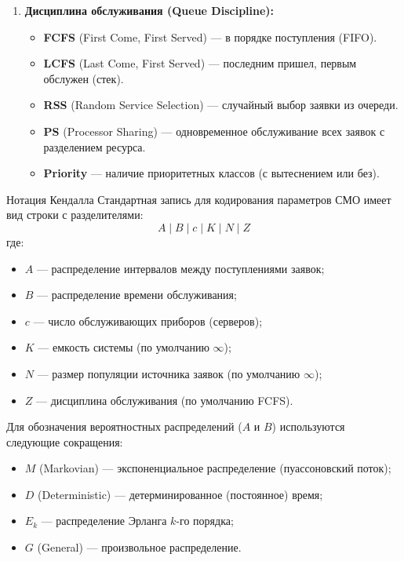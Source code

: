 \begin{enumerate}
    \item \textbf{Дисциплина обслуживания (Queue Discipline):}
    \begin{itemize}
        \item \textbf{FCFS} (First Come, First Served) — в порядке поступления (FIFO).
        \item \textbf{LCFS} (Last Come, First Served) — последним пришел, первым обслужен (стек).
        \item \textbf{RSS} (Random Service Selection) — случайный выбор заявки из очереди.
        \item \textbf{PS} (Processor Sharing) — одновременное обслуживание всех заявок с разделением ресурса.
        \item \textbf{Priority} — наличие приоритетных классов (с вытеснением или без).
    \end{itemize}
\end{enumerate}

\begin{definition}{Нотация Кендалла}
Стандартная запись для кодирования параметров СМО имеет вид строки с разделителями:
$$ A \mid B \mid c \mid K \mid N \mid Z $$
где:
\begin{itemize}
    \item $A$ — распределение интервалов между поступлениями заявок;
    \item $B$ — распределение времени обслуживания;
    \item $c$ — число обслуживающих приборов (серверов);
    \item $K$ — емкость системы (по умолчанию $\infty$);
    \item $N$ — размер популяции источника заявок (по умолчанию $\infty$);
    \item $Z$ — дисциплина обслуживания (по умолчанию FCFS).
\end{itemize}
\end{definition}

\begin{note}
Для обозначения вероятностных распределений ($A$ и $B$) используются следующие сокращения:
\begin{itemize}
    \item $M$ (Markovian) — экспоненциальное распределение (пуассоновский поток);
    \item $D$ (Deterministic) — детерминированное (постоянное) время;
    \item $E_k$ — распределение Эрланга $k$-го порядка;
    \item $G$ (General) — произвольное распределение.
\end{itemize}
\end{note}

